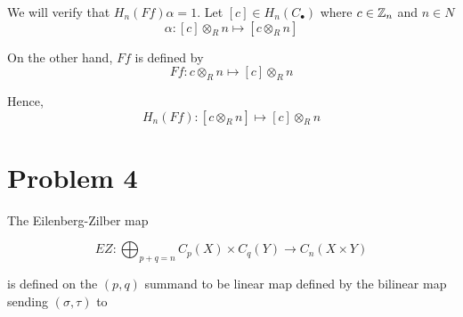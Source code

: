 \documentclass{article}
\begin{document}
\begin{center}
\end{center}

We will verify that $H_n(Ff) \alpha = 1$. Let $[c] \in H_n(C_\bullet)$ where $c \in \mathbb{Z}_n$ and $n \in N$
$$
    \alpha: [c] \otimes_R n \mapsto [c \otimes_R n]
$$

On the other hand, $Ff$ is defined by
$$
    Ff: c \otimes_R n \mapsto [c] \otimes_R n
$$

Hence,
$$
    H_n(Ff): [c \otimes_R n] \mapsto [c] \otimes_R n
$$

\begin{center}
\end{center}


\section{Problem 4}

The Eilenberg-Zilber map

$$
    EZ: \bigoplus_{p+q = n} C_p(X) \times C_q(Y) \to C_n(X \times Y)
$$

is defined on the $(p, q)$ summand to be linear map defined by the bilinear map sending $(\sigma, \tau)$ to
\end{document}
